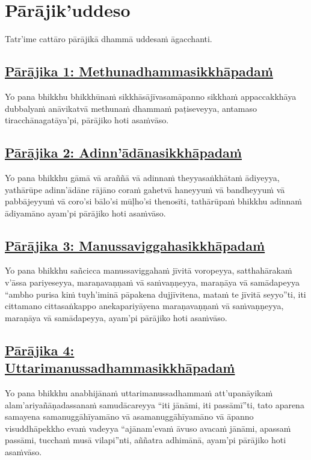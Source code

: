 \section{Pārājik'uddeso}
\label{par}

\begin{intro}
  Tatr'ime cattāro pārājikā dhammā uddesaṁ āgacchanti.
\end{intro}

\setsubsecheadstyle{\subsubsectionFmt}
\subsection*{\hyperref[disq1]{Pārājika 1: Methunadhammasikkhāpadaṁ}}
\label{par1}
Yo pana bhikkhu bhikkhūnaṁ sikkhāsājīvasamāpanno sikkhaṁ appaccakkhāya dubbalyaṁ anāvikatvā methunaṁ dhammaṁ paṭiseveyya, antamaso tiracchānagatāya'pi, pārājiko hoti asaṁvāso.

\subsection*{\hyperref[disq2]{Pārājika 2: Adinn'ādānasikkhāpadaṁ}}
\label{par2}
Yo pana bhikkhu gāmā vā araññā vā adinnaṁ theyyasaṅkhātaṁ ādiyeyya, yathārūpe adinn'ādāne rājāno coraṁ gahetvā haneyyuṁ vā bandheyyuṁ vā pabbājeyyuṁ vā coro'si bālo'si mūḷho'si thenosīti, tathārūpaṁ bhikkhu adinnaṁ ādiyamāno ayam'pi pārājiko hoti asaṁvāso.

\subsection*{\hyperref[disq3]{Pārājika 3: Manussaviggahasikkhāpadaṁ}}
\label{par3}
Yo pana bhikkhu sañcicca manussaviggahaṁ jīvitā voropeyya, satthahārakaṁ v'āssa pariyeseyya, maraṇavaṇṇaṁ vā saṁvaṇṇeyya, maraṇāya vā samādapeyya “ambho purisa kiṁ tuyh'iminā pāpakena dujjīvitena, mataṁ te jīvitā seyyo”ti, iti cittamano cittasaṅkappo anekapariyāyena maraṇavaṇṇaṁ vā saṁvaṇṇeyya, maraṇāya vā samādapeyya, ayam'pi pārājiko hoti asaṁvāso.

\subsection*{\hyperref[disq4]{Pārājika 4: Uttarimanussadhammasikkhāpadaṁ}}
\label{par4}
Yo pana bhikkhu anabhijānaṁ uttarimanussadhammaṁ att'upanāyikaṁ alam'ariyañāṇadassanaṁ samudācareyya “iti jānāmi, iti passāmī”ti, tato aparena samayena samanuggāhīyamāno vā asamanuggāhīyamāno vā āpanno visuddhāpekkho evaṁ vadeyya “ajānam'evaṁ āvuso avacaṁ jānāmi, apassaṁ passāmi, tucchaṁ musā vilapi”nti, aññatra adhimānā, ayam'pi pārājiko hoti asaṁvāso.

